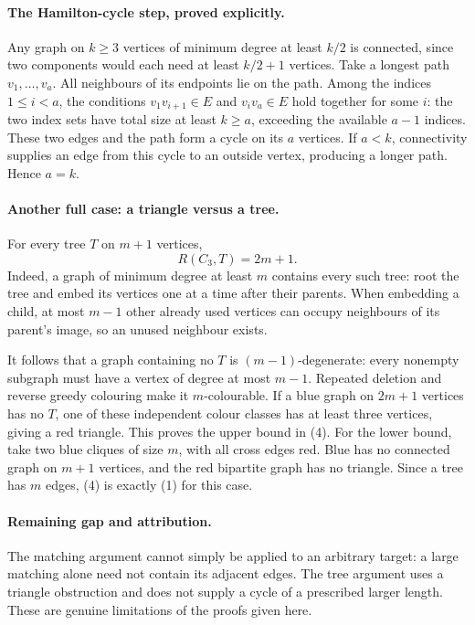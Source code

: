 \paragraph{The Hamilton-cycle step, proved explicitly.}
Any graph on \(k\geq3\) vertices of minimum degree at least \(k/2\)
is connected, since two components would each need at least
\(k/2+1\) vertices.
Take a longest path \(v_1,\ldots,v_a\). All neighbours of its
endpoints lie on the path. Among the indices \(1\leq i<a\),
the conditions \(v_1v_{i+1}\in E\) and \(v_iv_a\in E\)
hold together for some \(i\): the two index sets have total size
at least \(k\geq a\), exceeding the available \(a-1\) indices.
These two edges and the path form a cycle on its \(a\) vertices.
If \(a<k\), connectivity supplies an edge from this cycle to an
outside vertex, producing a longer path. Hence \(a=k\).

\paragraph{Another full case: a triangle versus a tree.}
For every tree \(T\) on \(m+1\) vertices,
\[
 R(C_3,T)=2m+1. \tag{4}
\]
Indeed, a graph of minimum degree at least \(m\) contains every
such tree: root the tree and embed its vertices one at a time after
their parents. When embedding a child, at most \(m-1\) other
already used vertices can occupy neighbours of its parent's image,
so an unused neighbour exists.

It follows that a graph containing no \(T\) is \((m-1)\)-degenerate:
every nonempty subgraph must have a vertex of degree at most \(m-1\).
Repeated deletion and reverse greedy colouring make it \(m\)-colourable.
If a blue graph on \(2m+1\) vertices has no \(T\), one of these
independent colour classes has at least three vertices, giving a
red triangle. This proves the upper bound in (4).
For the lower bound, take two blue cliques of size \(m\), with
all cross edges red. Blue has no connected graph on \(m+1\)
vertices, and the red bipartite graph has no triangle.
Since a tree has \(m\) edges, (4) is exactly (1) for this case.

\paragraph{Remaining gap and attribution.}
The matching argument cannot simply be applied to an arbitrary
target: a large matching alone need not contain its adjacent edges.
The tree argument uses a triangle obstruction and does not supply
a cycle of a prescribed larger length. These are genuine limitations
of the proofs given here.

